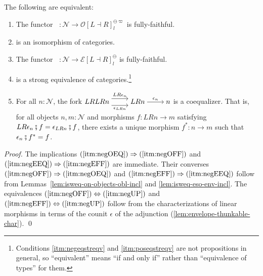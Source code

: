 \documentclass[runningheads]{llncs}
\newcommand{\phantomsout}[1]{\sout{\phantom{#1}}}
\newcommand*\rocqlogo{\usebox{\rocqlogobox}}
\newcommand{\lemmaref}[3]{\href{https://github.com/UniMath/UniMath/blob/94fae0eda57a778cec704bfa73b4ff525c9bc475/#1\#L#2?name=#3}{\rocqlogo}}
\newcommand{\acat}[1]{\mathcal{#1}}
\newcommand{\NN}{\acat{N}}
\newcommand{\OO}{\acat{O}}
\newcommand{\EE}{\acat{E}}
\newcommand{\Cl}[1]{#1_l}
\newcommand{\Cn}[1]{#1^\ominus}
\newcommand{\Csn}[2]{#1^{\ominus#2}}
\newcommand{\Cnl}[1]{\Cn{\Cl{#1}}}
\newcommand{\Csnl}[2]{\Csn{\Cl{#1}}{#2}}
\newcommand{\Obl}[1]{\OO[#1]}
\newcommand{\Env}[1]{\EE[#1]}
\newcommand{\dcomp}{\fatsemi}
\newcommand{\innegE}{\mathop{\iota^{\ominus}_{\EE}}}
\newcommand{\innegO}{\mathop{\iota^{\ominus}_{\OO}}}
\begin{document}
\begin{theorem}[{\lemmaref{UniMath/CategoryTheory/Nonassociative/Duploids/FromAdjunction/EqualizingRequirement.v}{579}{ff\_negative\_to\_oblique\_iff\_equ}}]
\label{thm:equalizing}
The following are equivalent:
\begin{enumerate}
\item {}\label{itm:negeqfst}The functor \(\innegO \colon \NN \to \Csnl{\Obl{L \dashv R}}\varpi\) is fully\hyp{}faithful.\label{itm:negOFF}
\item \phantomsout{The functor \(\innegO \colon \NN \to \Csnl{\Obl{L \dashv R}}\varpi\)} is an isomorphism of categories.\label{itm:negOEQ}
\item {}The functor \(\innegE \colon \NN \to \Cnl{\Env{L \dashv R}}\) is
fully\hyp{}faithful.\label{itm:negEFF}
\item \phantomsout{The functor \(\innegE \colon \NN \to \Cnl{\Env{L \dashv R}}\)}
is a strong equivalence of
categories.\label{itm:negeqstreqv}\label{itm:negEEQ}\footnote{Conditions \ref{itm:negeqstreqv} and \ref{itm:poseqstreqv} are
not propositions in general, so ``equivalent'' means ``if and only if''
rather than ``equivalence of types'' for them.\label{fn:equalizing-equiv-iff}}
\item \label{itm:negeqlast}\label{itm:negUP}For all \(n : \NN\), the fork
\(\begin{tikzcd}[cramped]%
            LRLRn & LRn & n
            \arrow["{LR\epsilon_n}", shift left=2, from=1-1, to=1-2]
            \arrow["{\epsilon_{LRn}}"', shift right=2, from=1-1, to=1-2]
            \arrow["{\epsilon_n}", from=1-2, to=1-3]
    \end{tikzcd}\)
is a coequalizer.
That is, for all objects \(n, m : \NN\) and morphisms \(f \colon
    LRn \to m\) satisfying \(LR\epsilon_n \dcomp f = \epsilon_{LRn}
    \dcomp f\), there exists a unique morphism \(f^* \colon n \to m\) such that
\(\epsilon_n \dcomp f^* = f\).
\end{enumerate}
\end{theorem}
\begin{proof}
The implications \((\ref{itm:negOEQ}) \Rightarrow
(\ref{itm:negOFF})\) and \((\ref{itm:negEEQ}) \Rightarrow
(\ref{itm:negEFF})\) are immediate. Their converses
\((\ref{itm:negOFF}) \Rightarrow (\ref{itm:negOEQ})\) and
\((\ref{itm:negEFF}) \Rightarrow (\ref{itm:negEEQ})\) follow from
Lemmas~\ref{lem:isweq-on-objects-obl-incl} and
\ref{lem:isweq-eso-env-incl}.  The equivalences \((\ref{itm:negOFF})
\Leftrightarrow (\ref{itm:negUP})\) and \((\ref{itm:negEFF})
\Leftrightarrow (\ref{itm:negUP})\) follow from the
characterizations of linear morphisms in terms of the counit
\(\epsilon\) of the adjunction
(\autoref{lem:envelope-thunkable-char}).
\qed
\end{proof}
\end{document}
